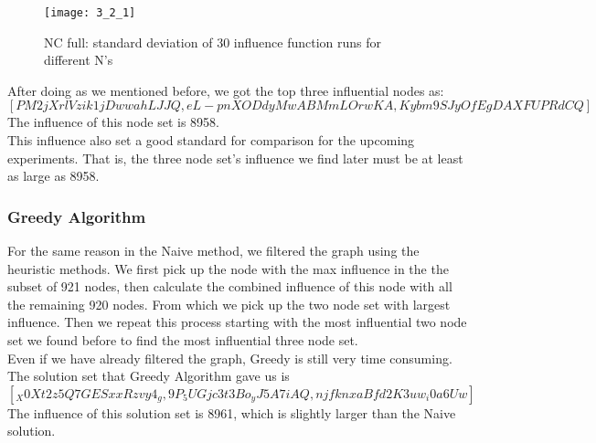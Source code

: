 \documentclass{article}
\begin{document}
\begin{figure}[h]
\begin{center}
\texttt{[image: 3\_2\_1]} %
\caption{NC full: standard deviation of 30 influence function runs for different N's}
\end{center}
\end{figure}






After doing as we mentioned before, we got the top three influential nodes as: \\
$[PM2jXrlVzik1jDwwahLJJQ, eL-pnXODdyMwABMmLOrwKA, Kybm9SJyOfEgDAXFUPRdCQ]$ \\
The influence of this node set is 8958. \\
This influence also set a good standard for comparison for the upcoming experiments. That is, the three node set's influence we find later must be at least as large as 8958.



\subsubsection{Greedy Algorithm}   %

For the same reason in the Naive method, we filtered the graph using the heuristic methods. We first pick up the node with the max influence in the the subset of 921 nodes, then calculate the combined influence of this node with all the remaining 920 nodes. From which we pick up the two node set with largest influence. Then we repeat this process starting with the most influential two node set we found before to find the most influential three node set. \\
Even if we have already filtered the graph, Greedy is still very time consuming.   \\
The solution set that Greedy Algorithm gave us is \\
$[_X0Xt2z5Q7GESxxRzvy4_g, 9P_5UGjc3t3Bo_yJ5A7iAQ,njfknxaBfd2K3uw_i0a6Uw]$  \\
The influence of this solution set is 8961, which is slightly larger than the Naive solution.
\end{document}
